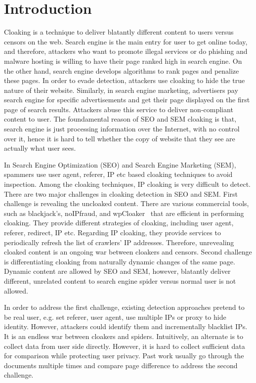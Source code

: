\section{Introduction}
\label{s:intro}

Cloaking is a technique to deliver blatantly different content to users versus
censors on the web. 
Search engine is the main entry for user to get online today, and therefore,
attackers who want to promote illegal services or do phishing and malware
hosting is willing to have their page ranked high in search engine.
On the other hand, search engine develops algorithms to rank pages and penalize
these pages. In order to evade detection, attackers use cloaking to hide the
true nature of their website.
Similarly, in search engine marketing, advertisers pay search engine for
specific advertisements and get their page displayed on the first page of search
results. Attackers abuse this service to deliver non-compliant content to user.
The foundamental reason of SEO and SEM cloaking is that, search engine is just processing
information over the Internet, with no control over it, hence it is hard to
tell whether the copy of website that they see are actually what user sees.

In Search Engine Optimization (SEO) and Search Engine Marketing (SEM),
spammers use user agent, referer, IP etc based cloaking
techniques to avoid inspection. Among the cloaking techniques, IP cloaking is
very difficult to detect. 
There are two major challenges in cloaking detection in SEO and SEM.
First challenge is revealing the uncloaked content. There are various
commercial tools, such as blackjack's, noIPfraud, and wpCloaker~\cite{intro:cloakware}
that are efficient in performing cloaking.
They provide different strategies of cloaking, including user agent, referer,
redirect, IP etc. Regarding IP cloaking, they provide services to periodically refresh the list of
crawlers' IP addresses. Therefore, unrevealing cloaked content is an ongoing war
between cloakers and censors.
Second challenge is differentiating
cloaking from naturally dynamic changes of the same page. Dynamic content are
allowed by SEO and SEM, however, blatantly deliver different, unrelated content
to search engine spider versus normal user is not allowed.

In order to address the first challenge, existing detection approaches pretend to be real user, e.g. set
referer, user agent, use multiple IPs or proxy to hide identity. However,
attackers could identify them and incrementally blacklist IPs. It is an endless
war between cloakers and spiders.
Intuitively, an alternate is to collect data from user side directly. However, it is hard
to collect sufficient data for comparison while protecting user privacy.
Past work usually go through the documents multiple times and compare page
difference to address the second challenge.

